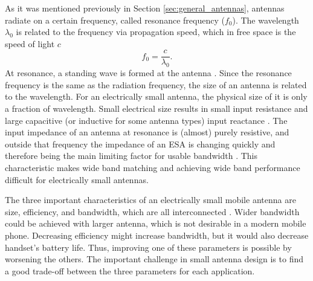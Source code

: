 As it was mentioned previously in Section \ref{sec:general_antennas}, antennas radiate on a certain frequency, called resonance frequency ($f_0$). The wavelength $\lambda_0$ is related to the frequency via propagation speed, which in free space is the speed of light $c$ \cite{stutzman}
\begin{equation}
\label{eq:fcl}
    f_0 = \frac{c}{\lambda_0}.
\end{equation}
At resonance, a standing wave is formed at the antenna \cite{stutzman}. Since the resonance frequency is the same as the radiation frequency, the size of an antenna is related to the wavelength. For an electrically small antenna, the physical size of it is only a fraction of wavelength. Small electrical size results in small input resistance and large capacitive (or inductive for some antenna types) input reactance \cite{modern_small_antennas}. The input impedance of an antenna at resonance is (almost) purely resistive, and outside that frequency the impedance of an ESA is changing quickly and therefore being the main limiting factor for usable bandwidth \cite{holopainen_phd}. This characteristic makes wide band matching and achieving wide band performance difficult for electrically small antennas.

The three important characteristics of an electrically small mobile antenna are size, efficiency, and bandwidth, which are all interconnected \cite{holopainen_phd}. Wider bandwidth could be achieved with larger antenna, which is not desirable in a modern mobile phone. Decreasing efficiency might increase bandwidth, but it would also decrease handset's battery life. Thus, improving one of these parameters is possible by worsening the others. The important challenge in small antenna design is to find a good trade-off between the three parameters for each application.


